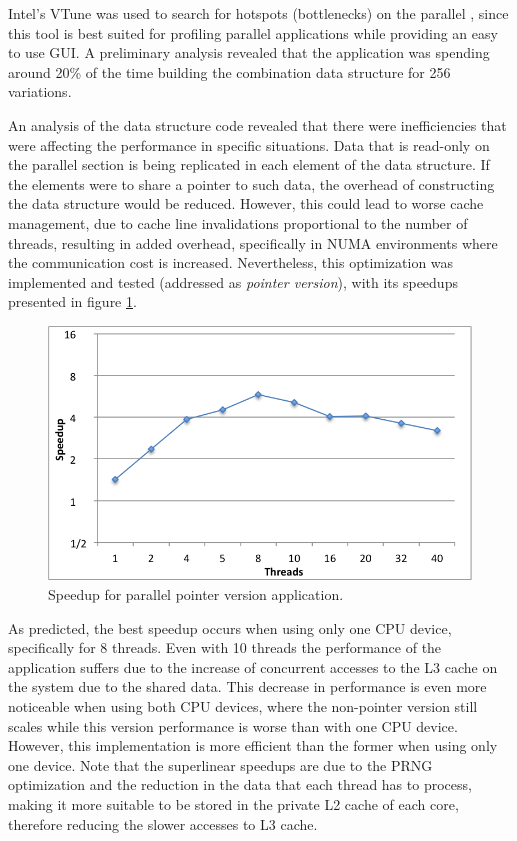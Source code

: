 
Intel's VTune was used to search for hotspots (bottlenecks) on the parallel \tth, since this tool is best suited for profiling parallel applications while providing an easy to use GUI. A preliminary analysis revealed that the application was spending around 20\% of the time building the combination data structure for 256 variations.

An analysis of the data structure code revealed that there were inefficiencies that were affecting the performance in specific situations. Data that is read-only on the parallel section is being replicated in each element of the data structure. If the elements were to share a pointer to such data, the overhead of constructing the data structure would be reduced. However, this could lead to worse cache management, due to cache line invalidations proportional to the number of threads, resulting in added overhead, specifically in NUMA environments where the communication cost is increased. Nevertheless, this optimization was implemented and tested (addressed as \textit{pointer version}), with its speedups presented in figure \ref{fig:pointer_speedup}.

\begin{figure}[!htp]
	\begin{center}
		\includegraphics[scale=0.4]{charts/speedup_pointer_omp.png}
		\caption{Speedup for \tth parallel pointer version application.}
		\label{fig:pointer_speedup}
	\end{center}
\end{figure}

As predicted, the best speedup occurs when using only one CPU device, specifically for 8 threads. Even with 10 threads the performance of the application suffers due to the increase of concurrent accesses to the L3 cache on the system due to the shared data. This decrease in performance is even more noticeable when using both CPU devices, where the non-pointer version still scales while this version performance is worse than with one CPU device. However, this implementation is more efficient than the former when using only one device. Note that the superlinear speedups are due to the PRNG optimization and the reduction in the data that each thread has to process, making it more suitable to be stored in the private L2 cache of each core, therefore reducing the slower accesses to L3 cache.
